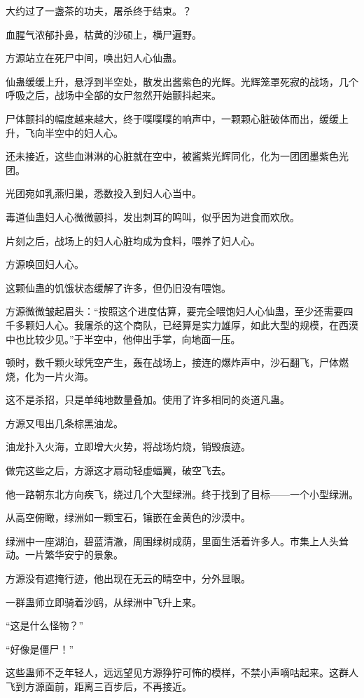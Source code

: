 
\begin{this_body}

大约过了一盏茶的功夫，屠杀终于结束。？

血腥气浓郁扑鼻，枯黄的沙硕上，横尸遍野。

方源站立在死尸中间，唤出妇人心仙蛊。

仙蛊缓缓上升，悬浮到半空处，散发出酱紫色的光辉。光辉笼罩死寂的战场，几个呼吸之后，战场中全部的女尸忽然开始颤抖起来。

尸体颤抖的幅度越来越大，终于噗噗噗的响声中，一颗颗心脏破体而出，缓缓上升，飞向半空中的妇人心。

还未接近，这些血淋淋的心脏就在空中，被酱紫光辉同化，化为一团团墨紫色光团。

光团宛如乳燕归巢，悉数投入到妇人心当中。

毒道仙蛊妇人心微微颤抖，发出刺耳的鸣叫，似乎因为进食而欢欣。

片刻之后，战场上的妇人心脏均成为食料，喂养了妇人心。

方源唤回妇人心。

这颗仙蛊的饥饿状态缓解了许多，但仍旧没有喂饱。

方源微微皱起眉头：“按照这个进度估算，要完全喂饱妇人心仙蛊，至少还需要四千多颗妇人心。我屠杀的这个商队，已经算是实力雄厚，如此大型的规模，在西漠中也比较少见。”于半空中，他伸出手掌，向地面一压。

顿时，数千颗火球凭空产生，轰在战场上，接连的爆炸声中，沙石翻飞，尸体燃烧，化为一片火海。

这不是杀招，只是单纯地数量叠加。使用了许多相同的炎道凡蛊。

方源又甩出几条棕黑油龙。

油龙扑入火海，立即增大火势，将战场灼烧，销毁痕迹。

做完这些之后，方源这才扇动轻虚蝠翼，破空飞去。

他一路朝东北方向疾飞，绕过几个大型绿洲。终于找到了目标——一个小型绿洲。

从高空俯瞰，绿洲如一颗宝石，镶嵌在金黄色的沙漠中。

绿洲中一座湖泊，碧蓝清澈，周围绿树成荫，里面生活着许多人。市集上人头耸动。一片繁华安宁的景象。

方源没有遮掩行迹，他出现在无云的晴空中，分外显眼。

一群蛊师立即骑着沙鸥，从绿洲中飞升上来。

“这是什么怪物？”

“好像是僵尸！”

这些蛊师不乏年轻人，远远望见方源狰狞可怖的模样，不禁小声嘀咕起来。这群人飞到方源面前，距离三百步后，不再接近。


\end{this_body}
